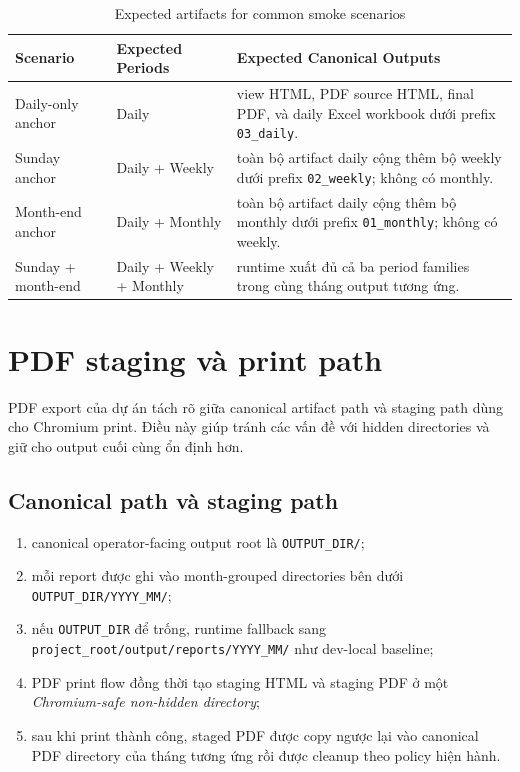 \begin{table}[htbp]
	\centering
	\renewcommand{\arraystretch}{1.3}
	\caption{Expected artifacts for common smoke scenarios}
	\label{tab:scheduled_artifacts}
	\begin{tabularx}{\linewidth}{|>{\RaggedRight\arraybackslash}p{2.7cm}|>{\RaggedRight\arraybackslash}p{2.6cm}|>{\RaggedRight\arraybackslash}X|}
		\hline
		\textbf{Scenario} & \textbf{Expected Periods} & \textbf{Expected Canonical Outputs} \\ \hline
		Daily-only anchor & Daily & view HTML, PDF source HTML, final PDF, và daily Excel workbook dưới prefix \texttt{03\_daily}. \\ \hline
		Sunday anchor & Daily + Weekly & toàn bộ artifact daily cộng thêm bộ weekly dưới prefix \texttt{02\_weekly}; không có monthly. \\ \hline
		Month-end anchor & Daily + Monthly & toàn bộ artifact daily cộng thêm bộ monthly dưới prefix \texttt{01\_monthly}; không có weekly. \\ \hline
		Sunday + month-end & Daily + Weekly + Monthly & runtime xuất đủ cả ba period families trong cùng tháng output tương ứng. \\ \hline
	\end{tabularx}
\end{table}

\section{PDF staging và print path}

PDF export của dự án tách rõ giữa canonical artifact path và staging path dùng cho Chromium print. Điều này giúp tránh các vấn đề với hidden directories và giữ cho output cuối cùng ổn định hơn.

\subsection{Canonical path và staging path}

\begin{enumerate}[label=-]
\item canonical operator-facing output root là \texttt{OUTPUT\_DIR/};
\item mỗi report được ghi vào month-grouped directories bên dưới \texttt{OUTPUT\_DIR/YYYY\_MM/};
\item nếu \texttt{OUTPUT\_DIR} để trống, runtime fallback sang \texttt{project\_root/output/reports/YYYY\_MM/} như dev-local baseline;
\item PDF print flow đồng thời tạo staging HTML và staging PDF ở một \textit{Chromium-safe non-hidden directory};
\item sau khi print thành công, staged PDF được copy ngược lại vào canonical PDF directory của tháng tương ứng rồi được cleanup theo policy hiện hành.
\end{enumerate}

